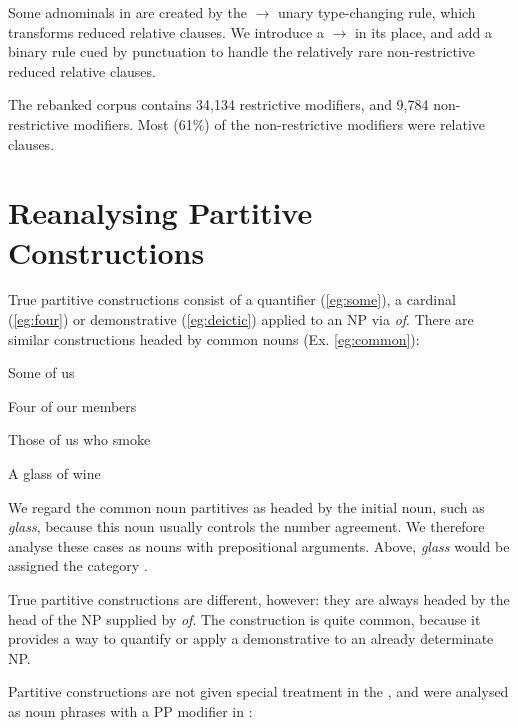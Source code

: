 \documentclass[11pt]{article}
\begin{document}
Some adnominals in \ccgbank are created by the  $\rightarrow$ 
 unary type-changing rule, which transforms reduced relative
clauses. We introduce a  $\rightarrow$  in its place,
and add a binary rule cued by punctuation to handle the relatively
rare non-restrictive reduced relative clauses.


The rebanked corpus contains 34,134  restrictive modifiers, and
9,784 non-restrictive modifiers. Most (61\%) of the non-restrictive modifiers
were relative clauses.

\section{Reanalysing Partitive Constructions}

True partitive constructions consist of a quantifier (\ref{eg:some}), a 
cardinal (\ref{eg:four}) or demonstrative (\ref{eg:deictic}) applied to an NP
via \emph{of}.
There are similar constructions headed by common nouns (Ex. \ref{eg:common}):
\begin{lexamples}
\addtolength{\itemsep}{-.99\itemsep}
 \item Some of us\label{eg:some}
 \item Four of our members\label{eg:four}
 \item Those of us who smoke\label{eg:deictic}
 \item A glass of wine\label{eg:common}
\end{lexamples}
We regard the common noun partitives as headed by the initial noun, such as \emph{glass},
because this noun usually controls the number agreement. We therefore analyse
these cases as nouns with prepositional arguments. Above, \emph{glass} would be
assigned the category .

True partitive constructions are different, however: they are always headed by the
head of the NP supplied by \emph{of}. The construction is quite common, because
it provides a way to quantify or apply a demonstrative to an already determinate NP.

Partitive constructions are not given special treatment in the \penn, and were
analysed as noun phrases with a PP modifier in \ccgbank:
\end{document}
